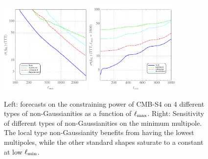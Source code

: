 \begin{figure}[ht]
\centering
\includegraphics[width=0.4\textwidth]{Inflation/DeltaFNL_TTT}
\includegraphics[width=0.415\textwidth]{Inflation/DeltaFNL_TTT_lmin}
\caption{Left: forecasts on the constraining power of CMB-S4 on 4 different types of non-Gaussianities as a function of $\ell_{\rm max}$. Right: Sensitivity of different types of non-Gaussianities on the minimum multipole. The local type non-Gaussianity benefits from having the lowest multipoles, while the other standard shapes saturate to a constant at low $\ell_{\rm min}$. }
\label{fig_fnlforecast}
\end{figure}

